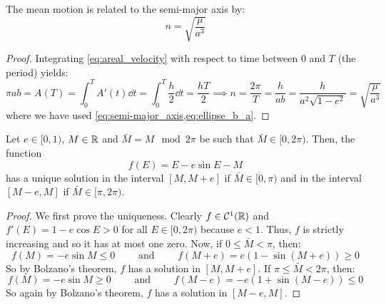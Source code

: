 \documentclass[../main.tex]{subfiles}
\begin{document}
\begin{proposition}
  The mean motion is related to the semi-major axis by:
  \begin{equation}
    n=\sqrt{\frac{\mu}{a^3}}
  \end{equation}
\end{proposition}
\begin{proof}
  Integrating \cref{eq:areal_velocity} with respect to time between 0 and $T$ (the period) yields:
  \begin{equation}
    \pi a b=A(T)=\int_0^T A'(t)\dd{t}=\int_0^T \frac{h}{2}\dd{t}=\frac{hT}{2}\implies n=\frac{2\pi}{T}=\frac{h}{a b}=\frac{h}{a^2\sqrt{1-e^2}}=\sqrt{\frac{\mu}{a^3}}
  \end{equation}
  where we have used \cref{eq:semi-major_axis,eq:ellipse_b_a}.
\end{proof}
\begin{lemma}
  Let $e\in[0,1)$, $M\in\mathbb{R}$ and $\bar{M}=M\mod{2\pi}$ be such that $\bar{M}\in[0,2\pi)$. Then, the function
  \begin{equation}
    f(E) = E-e\sin E - M
  \end{equation}
  has a unique solution in the interval $[M, M+e]$ if $\bar{M}\in[0,\pi)$ and in the interval $[M-e, M]$ if $\bar{M}\in[\pi,2\pi)$.
\end{lemma}
\begin{proof}
  We first prove the uniqueness. Clearly $f\in\mathcal{C}^1(\mathbb{R})$ and $f'(E)=1-e\cos E> 0$ for all $E\in[0,2\pi)$ because $e<1$. Thus, $f$ is strictly increasing and so it has at most one zero. Now, if $0\leq \bar{M}< \pi$, then:
  \begin{equation}
    f(M)=-e\sin M\leq 0\qquad\text{ and }\qquad f(M+e)=e(1-\sin (M+e))\geq 0
  \end{equation}
  So by Bolzano's theorem, $f$ has a solution in $[M,M+e]$. If $\pi\leq \bar{M}< 2\pi$, then:
  \begin{equation}
    f(M)=-e\sin M\geq 0\qquad\text{ and }\qquad f(M-e)=-e(1+\sin (M-e))\leq 0
  \end{equation}
  So again by Bolzano's theorem, $f$ has a solution in $[M-e,M]$.
\end{proof}
\end{document}
